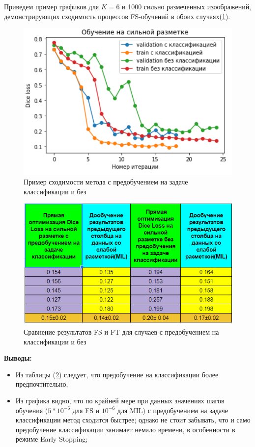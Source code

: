 \noindent Приведем пример графиков для $K = 6$ и 1000 сильно размеченных изоображений, демонстрирующих сходимость процессов FS-обучений в обоих случаях(\ref{fig:cmp_class_no_class}).

\begin{figure}[h!] 
  \center
  \includegraphics [scale=0.8] {images/cmp_class_no_class.png}
  \caption{ Пример сходимости метода с предобучением на задаче классификации и без} \label{fig:cmp_class_no_class}
\end{figure}

\begin{figure}[ht] 
  \center
  \includegraphics [scale=0.78] {images/shortcut.png}
  \caption{ Сравнение результатов FS и FT для случаев с предобучением на классификации и без} 
  \label{fig:cmp_pretrain}  
\end{figure}

{\bf Выводы:}

\begin{itemize}
    \item Из таблицы  (\ref{fig:cmp_pretrain}) следует, что  предобучение на классификации более предпочтительно;
    \item Из графика видно, что по крайней мере при данных значениях шагов обучения ($5*10^{-6}$ для FS и $10^{-6}$ для MIL) с предобучением на задаче классификации метод сходится быстрее; однако не стоит забывать, что и само предобучение классификации занимает немало времени, в особенности в режиме Early Stopping;

\end{itemize}


